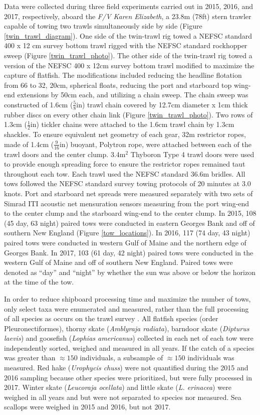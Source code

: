 \documentclass[
  12pt,
]{article}
\begin{document}
Data were collected during three field experiments carried out in 2015,
2016, and 2017, respectively, aboard the \emph{F/V Karen Elizabeth}, a
23.8m (78ft) stern trawler capable of towing two trawls simultaneously
side by side (Figure \ref{twin_trawl_diagram}). One side of the
twin-trawl rig towed a NEFSC standard 400 x 12 cm survey bottom trawl
rigged with the NEFSC standard rockhopper sweep \citep{politisetal14}
(Figure \ref{twin_trawl_photo}). The other side of the twin-trawl rig
towed a version of the NEFSC 400 x 12cm survey bottom trawl modified to
maximize the capture of flatfish. The modifications included reducing
the headline flotation from 66 to 32, 20cm, spherical floats, reducing
the port and starboard top wing-end extensions by 50cm each, and
utilizing a chain sweep. The chain sweep was constructed of 1.6cm
(\(\frac{5}{8}\)in) trawl chain covered by 12.7cm diameter x 1cm thick
rubber discs on every other chain link (Figure \ref{twin_trawl_photo}).
Two rows of 1.3cm (\(\frac{1}{2}\)in) tickler chains were attached to
the 1.6cm trawl chain by 1.3cm shackles. To ensure equivalent net
geometry of each gear, 32m restrictor ropes, made of 1.4cm
(\(\frac{9}{16}\)in) buoyant, Polytron rope, were attached between each
of the trawl doors and the center clump. 3.4m\(^2\) Thyboron Type 4
trawl doors were used to provide enough spreading force to ensure the
restrictor ropes remained taut throughout each tow. Each trawl used the
NEFSC standard 36.6m bridles. All tows followed the NEFSC standard
survey towing protocols of 20 minutes at 3.0 knots. Port and starboard
net spreads were measured separately with two sets of Simrad ITI
acoustic net mensuration sensors measuring from the port wing-end to the
center clump and the starboard wing-end to the center clump. In 2015,
108 (45 day, 63 night) paired tows were conducted in eastern Georges
Bank and off of southern New England (Figure \ref{tow_locations}). In
2016, 117 (74 day, 43 night) paired tows were conducted in western Gulf
of Maine and the northern edge of Georges Bank. In 2017, 103 (61 day, 42
night) paired tows were conducted in the western Gulf of Maine and off
of southern New England. Paired tows were denoted as ``day'' and
``night'' by whether the sun was above or below the horizon at the time
of the tow.

In order to reduce shipboard processing time and maximize the number of
tows, only select taxa were enumerated and measured, rather than the
full processing of all species as occurs on the trawl survey
\citep{politisetal14}. All flatfish species (order Pleuronectiformes),
thorny skate (\emph{Amblyraja radiata}), barndoor skate (\emph{Dipturus
laevis}) and goosefish (\emph{Lophias americanus}) collected in each net
of each tow were independently sorted, weighed and measured in all
years. If the catch of a species was greater than \({\approx}150\)
individuals, a subsample of \({\approx}150\) individuals was measured.
Red hake (\emph{Urophycis chuss}) were not quantified during the 2015
and 2016 sampling because other species were prioritized, but were fully
processed in 2017. Winter skate (\emph{Leucoraja ocellata}) and little
skate (\emph{L. erinacea}) were weighed in all years and but were not
separated to species nor measured. Sea scallops were weighed in 2015 and
2016, but not 2017.
\end{document}
